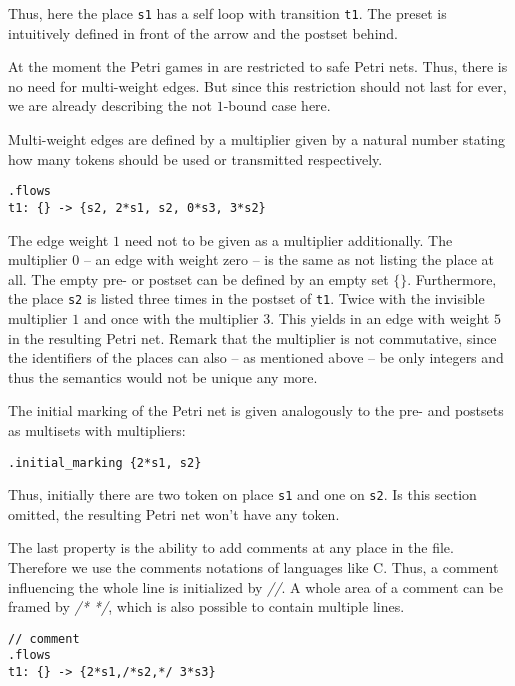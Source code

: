 Thus, here the place \texttt{s1} has a self loop with transition \texttt{t1}. The preset is intuitively defined in front of the arrow and the postset behind.

At the moment the Petri games in \tool{} are restricted to safe Petri nets. Thus, there is no need for multi-weight edges. But since this restriction should not last for ever, we are already describing the not $1$-bound case here. 

Multi-weight edges are defined by a multiplier given by a natural number stating how many tokens should be used or transmitted respectively.

\begin{lstlisting}[language=apt-format]
.flows
t1: {} -> {s2, 2*s1, s2, 0*s3, 3*s2} 
\end{lstlisting}

The edge weight $1$ need not to be given as a multiplier additionally. The multiplier $0$ -- an edge with weight zero -- is the same as not listing the place at all. The empty pre- or postset can be defined by an empty set $\{\}$. Furthermore, the place \texttt{s2} is listed three times in the postset of \texttt{t1}. Twice with the invisible multiplier $1$ and once with the multiplier $3$. This yields in an edge with weight $5$ in the resulting Petri net. Remark that the multiplier is not commutative, since the identifiers of the places can also -- as mentioned above -- be only integers and thus the semantics would not be unique any more.  

The initial marking of the Petri net is given analogously to the pre- and postsets as multisets with multipliers:

\begin{lstlisting}[language=apt-format]
.initial_marking {2*s1, s2}
\end{lstlisting}

Thus, initially there are two token on place \texttt{s1} and one on \texttt{s2}. Is this section omitted, the resulting Petri net won't have any token.

The last property is the ability to add comments at any place in the file. Therefore we use the comments notations of languages like C. Thus, a comment influencing the whole line is initialized by \textit{//}. A whole area of a comment can be framed by \textit{/* */}, which is also possible to contain multiple lines.

\begin{lstlisting}[language=apt-format]
// comment
.flows
t1: {} -> {2*s1,/*s2,*/ 3*s3}
\end{lstlisting}

